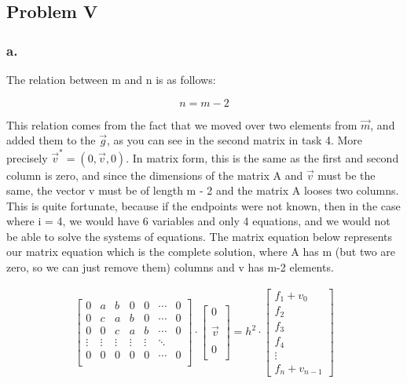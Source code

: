 \documentclass{article}
\begin{document}
\subsection*{Problem V}
\subsubsection*{a.}

The relation between m and n is as follows:

\begin{equation}
    n = m - 2
\end{equation}

This relation comes from the fact that we moved over two elements from $\Vec{m}$, and added them to the $\Vec{g}$, as you can see in the second matrix in task 4. More precisely $\Vec{v}^* = (0,\Vec{v},0)$. In matrix form, this is the same as the first and second column is zero, and since the dimensions of the matrix A and $\Vec{v}$ must be the same, the vector v must be of length m - 2 and the matrix A looses two columns. This is quite fortunate, because if the endpoints were not known, then in the case where i = 4, we would have 6 variables and only 4 equations, and we would not be able to solve the systems of equations.  The matrix equation below represents our matrix equation which is the complete solution, where A has m (but two are zero, so we can just remove them) columns and v has m-2 elements. 

\begin{gather}
    \begin{bmatrix}
     0 &a & b & 0 & 0 &\cdots&0\\ 0 & c & a &b& 0 &\cdots&0 \\ 0 & 0 & c & a & b &\cdots&0  \\ \vdots &\vdots&\vdots&\vdots&\vdots&\ddots \\0&0&0&0&0&\cdots&0 \\
    \end{bmatrix}\cdot \begin{bmatrix}
    0 \\  \\ \Vec{v} \\  \\ 0 \\
    \end{bmatrix} = h^2\cdot \begin{bmatrix}
    f_1 + v_0\\f_2  \\f_3 \\f_4 \\\vdots \\ f_n + v_{n-1}
    \end{bmatrix}
\end{gather}
\end{document}
